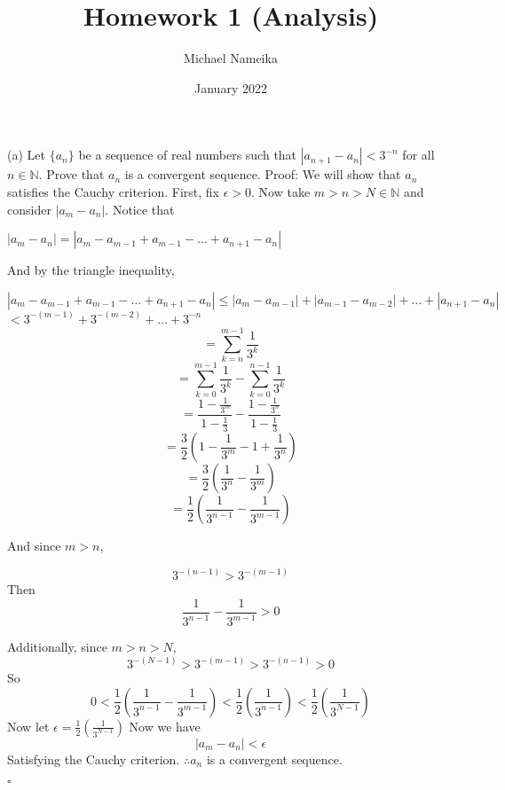 \documentclass{article}
\title{Homework 1 (Analysis)}
\author{Michael Nameika}
\date{January 2022}
\begin{document}
\maketitle

\section{}
(a) Let $\{a_n\}$ be a sequence of real numbers such that $|a_{n+1}-a_n| < 3^{-n}$ for all $n \in \mathbb{N}$. Prove that ${a_n}$ is a convergent sequence.
\newline\newline
Proof: We will show that ${a_n}$ satisfies the Cauchy criterion. First, fix $\epsilon > 0$. Now take $m>n>N\in \mathbb{N}$ and consider $|a_m-a_n|$.
\newline\newline
Notice that 
\begin{center}
    $|a_m-a_n| = |a_m-a_{m-1}+a_{m-1}- \ldots + a_{n+1} - a_n|$
\end{center}
And by the triangle inequality,
\begin{center}
    $|a_m-a_{m-1}+a_{m-1}- \ldots + a_{n+1} - a_n| \leq |a_m-a_{m-1}| + |a_{m-1} - a_{m-2}| + \ldots + |a_{n+1} - a_n|$
    \newline\newline
    $< 3^{-(m-1)} + 3^{-(m-2)} + \ldots + 3^{-n}$\
    \newline\newline
    \[=\sum_{k=n}^{m-1}\frac{1}{3^k} \]
    \[=\sum_{k=0}^{m-1}\frac{1}{3^k} - \sum_{k=0}^{n-1}\frac{1}{3^k}\]
    \[=\frac{1-\frac{1}{3^m}}{1-\frac{1}{3}} - \frac{1-\frac{1}{3^n}}{1-\frac{1}{3}}\]
    \[=\frac{3}{2}(1-\frac{1}{3^m}-1+\frac{1}{3^n})\]
    \[=\frac{3}{2}(\frac{1}{3^n} - \frac{1}{3^m})\]
    \[=\frac{1}{2}(\frac{1}{3^{n-1}} - \frac{1}{3^{m-1}})\]
    
\end{center}
And since $m > n$, 

\[3^{-(n-1)} > 3^{-(m-1)}\]
Then
\[\frac{1}{3^{n-1}} - \frac{1}{3^{m-1}} > 0  \]

Additionally, since $m>n>N$, 
\[3^{-(N-1)}>3^{-(m-1)}>3^{-(n-1)}>0 \]
So
\[0<\frac{1}{2}(\frac{1}{3^{n-1}} - \frac{1}{3^{m-1}}) < \frac{1}{2}(\frac{1}{3^{n-1}})<\frac{1}{2}(\frac{1}{3^{N-1}})\]
Now let $\epsilon = \frac{1}{2}(\frac{1}{3^{N-1}})$
\newline
Now we have 
\[|a_m-a_n|<\epsilon\]
Satisfying the Cauchy criterion.
\newline
$\therefore {a_n}$ is a convergent sequence.
\begin{flushright}
    $\square$
\end{flushright}
\end{document}
